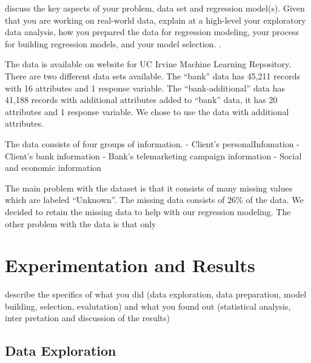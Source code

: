 \documentclass[english,man]{apa6}
\begin{document}
discuss the key aspects of your problem, data set and regression
model(s). Given that you are working on real-world data, explain at a
high-level your exploratory data analysis, how you prepared the data for
regression modeling, your process for building regression models, and
your model selection. .

The data is available on website for UC Irvine Machine Learning
Repository. There are two different data sets available. The
\enquote{bank} data has 45,211 records with 16 attributes and 1 response
variable. The \enquote{bank-additional} data has 41,188 records with
additional attributes added to \enquote{bank} data, it has 20 attributes
and 1 response variable. We chose to use the data with additional
attributes.

The data consists of four groups of information. - Client's
personalInfomation - Client's bank information - Bank's telemarketing
campaign information - Social and economic information

The main problem with the dataset is that it consists of many missing
values which are labeled \enquote{Unknown}. The missing data consists of
26\% of the data. We decided to retain the missing data to help with our
regression modeling. The other problem with the data is that only

\section{Experimentation and Results}\label{experimentation-and-results}

describe the specifics of what you did (data exploration, data
preparation, model building, selection, evalutation) and what you found
out (statistical analysis, inter pretation and discussion of the
results)

\subsection{Data Exploration}\label{data-exploration}
\end{document}
